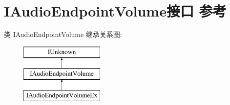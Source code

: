 \hypertarget{interface_i_audio_endpoint_volume}{}\section{I\+Audio\+Endpoint\+Volume接口 参考}
\label{interface_i_audio_endpoint_volume}
类 I\+Audio\+Endpoint\+Volume 继承关系图\+:\begin{figure}[H]
\begin{center}
\leavevmode
\includegraphics[height=3.000000cm]{interface_i_audio_endpoint_volume}
\end{center}
\end{figure}
